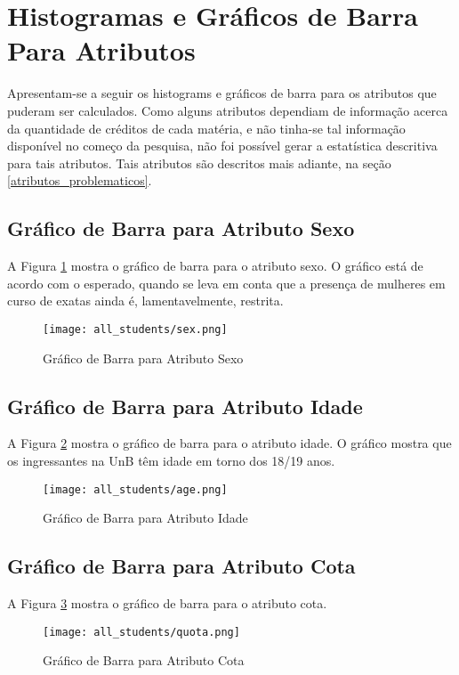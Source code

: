 
\section{Histogramas e Gráficos de Barra Para Atributos}
Apresentam-se a seguir os histograms e gráficos de barra para os atributos que puderam
ser calculados. Como alguns atributos dependiam de informação acerca da quantidade de
créditos de cada matéria, e não tinha-se tal informação disponível no começo da
pesquisa, não foi possível gerar a estatística descritiva para tais atributos. Tais
atributos são descritos mais adiante, na seção \ref{atributos_problematicos}.

\subsection{Gráfico de Barra para Atributo Sexo}
A Figura \ref{atr_sex} mostra o gráfico de barra para o atributo sexo. O gráfico
está de acordo com o esperado, quando se leva em conta que a presença de mulheres em
curso de exatas ainda é, lamentavelmente, restrita. 
\begin{figure}[!ht]
    \caption{Gráfico de Barra para Atributo Sexo}
    \centering
    \texttt{[image: all\_students/sex.png]}
    \label{atr_sex}
\end{figure}

\subsection{Gráfico de Barra para Atributo Idade}
A Figura \ref{atr_age} mostra o gráfico de barra para o atributo idade. O gráfico
mostra que os ingressantes na UnB têm idade em torno dos 18/19 anos. 
\begin{figure}[!ht]
    \caption{Gráfico de Barra para Atributo Idade}
    \centering
    \texttt{[image: all\_students/age.png]}
    \label{atr_age}
\end{figure}

\subsection{Gráfico de Barra para Atributo Cota}
A Figura \ref{atr_quota} mostra o gráfico de barra para o atributo cota. 
\begin{figure}[!ht]
    \caption{Gráfico de Barra para Atributo Cota}
    \centering
    \texttt{[image: all\_students/quota.png]}
    \label{atr_quota}
\end{figure}

